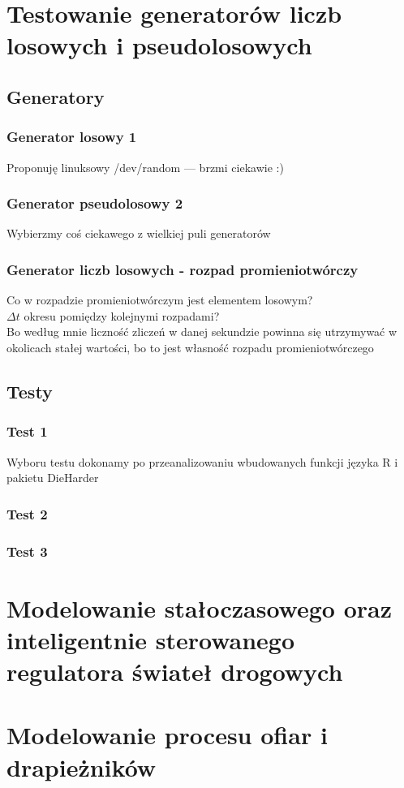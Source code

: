 \documentclass[11pt,a4paper]{article}
\author{Jakub Nowak, Żaneta Błaszczuk, Filip Kubicz, Jakub Porębski, Rafał Kozik}
\renewcommand{\[}{\begin{equation}}
\renewcommand{\]}{\end{equation}}
\begin{document}
\pagestyle{fancy}
\fancyfoot[C]{\thepage}

%
%
%

\section{Testowanie generatorów liczb losowych i pseudolosowych}
\subsection{Generatory}

\subsubsection{Generator losowy 1}
Proponuję linuksowy /dev/random --- brzmi ciekawie :)
\subsubsection{Generator pseudolosowy 2}
Wybierzmy coś ciekawego z wielkiej puli generatorów
\subsubsection{Generator liczb losowych - rozpad promieniotwórczy}
Co w rozpadzie promieniotwórczym jest elementem losowym?\\
$\Delta t$ okresu pomiędzy kolejnymi rozpadami?\\
Bo według mnie liczność zliczeń w danej sekundzie powinna się utrzymywać w okolicach stałej wartości, bo to jest własność rozpadu promieniotwórczego



\subsection{Testy}
\subsubsection{Test 1}
Wyboru testu dokonamy po przeanalizowaniu wbudowanych funkcji języka R i pakietu DieHarder
\subsubsection{Test 2}
\subsubsection{Test 3}


\section{Modelowanie stałoczasowego oraz inteligentnie sterowanego regulatora świateł drogowych}


\section{Modelowanie procesu ofiar i drapieżników}
\end{document}
